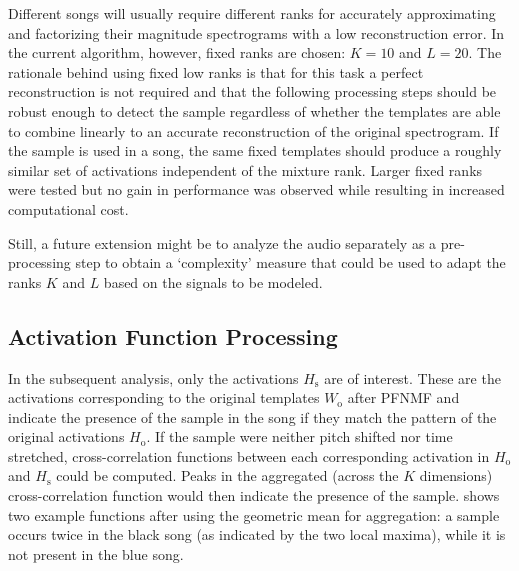 \documentclass{article}
\begin{document}
Different songs will usually require different ranks for accurately approximating and factorizing their magnitude spectrograms with a low reconstruction error. In the current algorithm, however, fixed ranks are chosen: $K=10$ and $L=20$. The rationale behind using fixed low ranks is that for this task a perfect reconstruction is not required and that the following processing steps should be robust enough to detect the sample regardless of whether the templates are able to combine linearly to an accurate reconstruction of  the original spectrogram. If the sample is used in a song, the same fixed templates should produce a roughly similar set of activations independent of the mixture rank. Larger fixed ranks were tested but no gain in performance was observed while resulting in increased computational cost.

Still, a future extension might be to analyze the audio separately as a pre-processing step to obtain a `complexity' measure that could be used to adapt the ranks $K$ and $L$ based on the signals to be modeled. 

\subsection{Activation Function Processing}
In the subsequent analysis, only the activations $H_\mathrm{s}$ are of interest. These are the activations corresponding to the original templates $W_\mathrm{o}$ after PFNMF and indicate the presence of the sample in the song if they match the pattern of the original activations $H_\mathrm{o}$. If the sample were neither pitch shifted nor time stretched, cross-correlation functions between each corresponding activation in $H_\mathrm{o}$ and $H_\mathrm{s}$ could be computed. Peaks in the aggregated (across the $K$ dimensions) cross-correlation function would then indicate the presence of the sample.  shows two example functions after using the geometric mean for aggregation: a sample occurs twice in the black song (as indicated by the two local maxima), while it is not present in the blue song.

\end{document}
